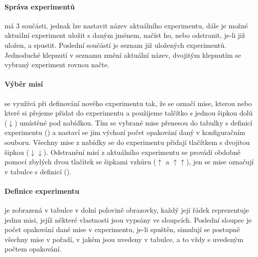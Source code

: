         \paragraph{ Správa experimentů} má 3 součásti, jednak lze nastavit název aktuálního experimentu, dále je možné aktuální experiment uložit s daným jménem, načíst ho, nebo odstranit, je-li již uložen, a spustit. Poslední součástí je seznam již uložených experimentů. Jednoduché klepnutí v seznamu změní aktuální název, dvojitým klepnutím se vybraný experiment rovnou načte.

        \paragraph{ Výběr misí} se využívá při definování nového experimentu tak, že se označí mise, kterou nebo které si přejeme přidat do experimentu a použijeme talčítko s jednou šipkou dolů ($\downarrow$) umístěné pod nabídkou. Tím se vybrané mise přenesou do tabulky s definicí experimentu () a nastaví se jim výchozí počet opakování daný v konfiguračním souboru. Všechny mise z nabídky se do experimentu přidají tlačítkem s dvojitou šipkou ($\downarrow\downarrow$). Odstranění misí z aktuálního experimentu se provádí obdobně pomocí zbylých dvou tlačítek se šipkami vzhůru ($\uparrow$ a $\uparrow\uparrow$), jen se mise označují v tabulce s definicí ().

        \paragraph{ Definice experimentu} je zobrazená v tabulce v dolní polovině obrazovky, každý její řádek reprezentuje jednu misi, jejíž některé vlastnosti jsou vypsány ve sloupcích. Poslední sloupec je počet opakování dané mise v experimentu, je-li spuštěn, simulují se postupně všechny mise v pořadí, v jakém jsou uvedeny v tabulce, a to vždy s uvedeným počtem opakování.